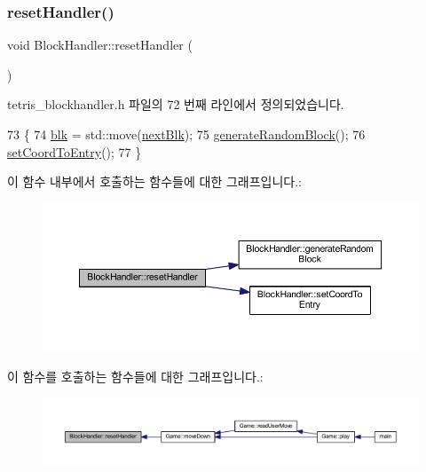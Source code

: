 \subsubsection{\texorpdfstring{reset\+Handler()}{resetHandler()}}
{\footnotesize\ttfamily void Block\+Handler\+::reset\+Handler (\begin{DoxyParamCaption}{ }\end{DoxyParamCaption})\hspace{0.3cm}{\ttfamily [inline]}}



tetris\+\_\+blockhandler.\+h 파일의 72 번째 라인에서 정의되었습니다.


\begin{DoxyCode}
73     \{
74         \mbox{\hyperlink{class_block_handler_ab57212ded2552ab5559d278c8538c454}{blk}} = std::move(\mbox{\hyperlink{class_block_handler_a7a7f96fa7c0d44f9e0fb5e52ebc9c428}{nextBlk}}); 
75         \mbox{\hyperlink{class_block_handler_afaa88871c837a9af8fc407690aadffd6}{generateRandomBlock}}();
76         \mbox{\hyperlink{class_block_handler_aa0143a5722a52a91357c184354d484a6}{setCoordToEntry}}();
77     \}
\end{DoxyCode}
이 함수 내부에서 호출하는 함수들에 대한 그래프입니다.\+:
\nopagebreak
\begin{figure}[H]
\begin{center}
\leavevmode
\includegraphics[width=350pt]{class_block_handler_a170a8b83b6df72530675d722a17fb8c4_cgraph}
\end{center}
\end{figure}
이 함수를 호출하는 함수들에 대한 그래프입니다.\+:
\nopagebreak
\begin{figure}[H]
\begin{center}
\leavevmode
\includegraphics[width=350pt]{class_block_handler_a170a8b83b6df72530675d722a17fb8c4_icgraph}
\end{center}
\end{figure}
\mbox{\label{class_block_handler_aa0143a5722a52a91357c184354d484a6}} 
